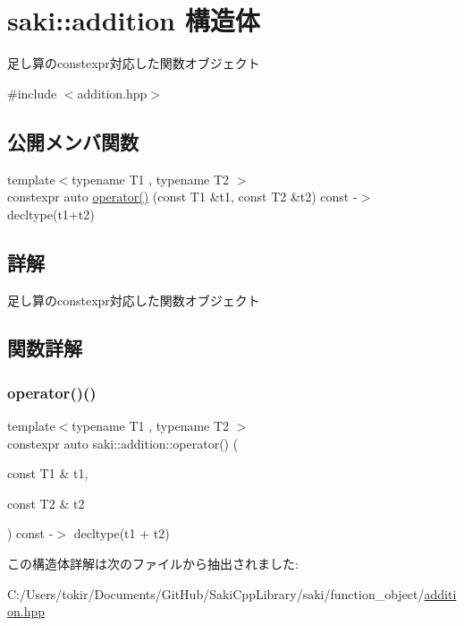 \hypertarget{structsaki_1_1addition}{}\section{saki\+:\+:addition 構造体}
\label{structsaki_1_1addition}


足し算のconstexpr対応した関数オブジェクト  




{\ttfamily \#include $<$addition.\+hpp$>$}

\subsection*{公開メンバ関数}
\begin{DoxyCompactItemize}
\item 
{\footnotesize template$<$typename T1 , typename T2 $>$ }\\constexpr auto \mbox{\hyperlink{structsaki_1_1addition_a9ff50aceb91ac6f0e821ee8d408a1e58}{operator()}} (const T1 \&t1, const T2 \&t2) const -\/$>$ decltype(t1+t2)
\end{DoxyCompactItemize}


\subsection{詳解}
足し算のconstexpr対応した関数オブジェクト 

\subsection{関数詳解}
\mbox{\label{structsaki_1_1addition_a9ff50aceb91ac6f0e821ee8d408a1e58}} 
\subsubsection{\texorpdfstring{operator()()}{operator()()}}
{\footnotesize\ttfamily template$<$typename T1 , typename T2 $>$ \\
constexpr auto saki\+::addition\+::operator() (\begin{DoxyParamCaption}\item[{const T1 \&}]{t1,  }\item[{const T2 \&}]{t2 }\end{DoxyParamCaption}) const -\/$>$ decltype(t1 + t2)
	\hspace{0.3cm}{\ttfamily [inline]}}



この構造体詳解は次のファイルから抽出されました\+:\begin{DoxyCompactItemize}
\item 
C\+:/\+Users/tokir/\+Documents/\+Git\+Hub/\+Saki\+Cpp\+Library/saki/function\+\_\+object/\mbox{\hyperlink{addition_8hpp}{addition.\+hpp}}\end{DoxyCompactItemize}
